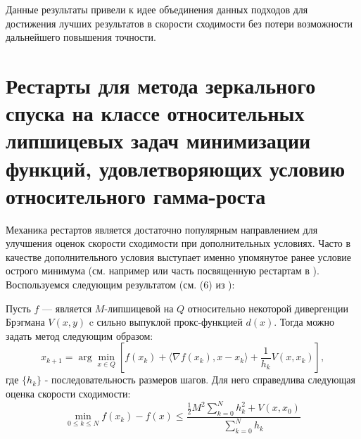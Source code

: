    Данные результаты привели к идее объединения данных подходов для достижения лучших результатов в скорости сходимости без потери возможности дальнейшего повышения точности.

\section{Рестарты для метода зеркального спуска на классе относительных липшицевых задач минимизации функций, удовлетворяющих условию относительного гамма-роста}\label{sec:ch3/sect3}
    Механика рестартов является достаточно популярным направлением для улучшения оценок скорости сходимости при дополнительных условиях. Часто в качестве дополнительного условия выступает именно упомянутое ранее условие острого минимума (см. например \cite{sharp_rest} или часть посвященную рестартам в \cite{sharp22}).
    Воспользуемся следующим результатом (см. (6) из \cite{Lu_2018}):
    \begin{theorem} \label{vanilla_mirror}
        Пусть $f$ --- является $M$-липшицевой на $Q$ относительно некоторой дивергенции Брэгмана $V(x, y)$ c сильно выпуклой прокс-функцией $d(x)$. Тогда можно задать метод следующим образом:
        \begin{equation} \label{mirr_upd}
            x_{k+1} = \arg \min_{x \in Q} {\left[ f(x_k) + \langle \nabla f(x_k), x - x_k \rangle + \frac{1}{h_k} V(x, x_k)\right]},
        \end{equation}
        где $\{ h_k \}$ - последовательность размеров шагов.
        Для него справедлива следующая оценка скорости сходимости:
        \begin{equation} \label{general_est}
            \min_{0\leq k \leq N} f(x_k) - f(x) \leq \frac{\frac{1}{2} M^2 \sum_{k=0}^N h_k^2 + V(x, x_0)}{\sum_{k=0}^N h_k}
        \end{equation}
    \end{theorem}

